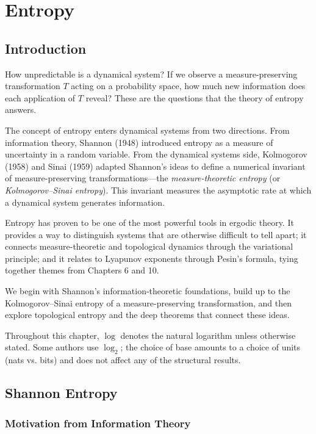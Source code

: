 \chapter{Entropy}\label{ch:11}

\section{Introduction}\label{sec:11.1}

How unpredictable is a dynamical system? If we observe a measure-preserving transformation $T$ acting on a probability space, how much new information does each application of $T$ reveal? These are the questions that the theory of entropy answers.

The concept of entropy enters dynamical systems from two directions. From information theory, Shannon (1948) introduced entropy as a measure of uncertainty in a random variable. From the dynamical systems side, Kolmogorov (1958) and Sinai (1959) adapted Shannon's ideas to define a numerical invariant of measure-preserving transformations---the \textit{measure-theoretic entropy} (or \textit{Kolmogorov--Sinai entropy}). This invariant measures the asymptotic rate at which a dynamical system generates information.

Entropy has proven to be one of the most powerful tools in ergodic theory. It provides a way to distinguish systems that are otherwise difficult to tell apart; it connects measure-theoretic and topological dynamics through the variational principle; and it relates to Lyapunov exponents through Pesin's formula, tying together themes from Chapters 6 and 10.

We begin with Shannon's information-theoretic foundations, build up to the Kolmogorov--Sinai entropy of a measure-preserving transformation, and then explore topological entropy and the deep theorems that connect these ideas.

Throughout this chapter, $\log$ denotes the natural logarithm unless otherwise stated. Some authors use $\log_2$; the choice of base amounts to a choice of units (nats vs. bits) and does not affect any of the structural results.


\bigskip


\section{Shannon Entropy}\label{sec:11.2}

\subsection{Motivation from Information Theory}\label{sec:11.2.1}

